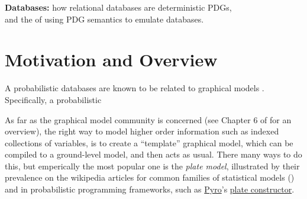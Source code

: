 \documentclass{article}
\theoremstyle{definition}
\theoremstyle{remark}
\begin{document}
\begin{center}
  \textbf{ \Large Databases:} how relational databases are deterministic PDGs,\\
  and the of using PDG semantics to emulate databases.
\end{center}

\section{Motivation and Overview}

A probabilistic databases are known to be related to graphical models \cite[\S 1.2.7]{suciu2011probabilistic}. Specifically, a probabilistic 

As far as the graphical model community is concerned (see Chapter 6 of \cite{KF09} for an overview), the right way to model higher order information such as indexed collections of variables, is to create a ``template'' graphical model, which can be compiled to a ground-level model, and then acts as usual. There many ways to do this, but emperically the most popular one is the \emph{plate model}, illustrated by their prevalence on the wikipedia articles for common families of statistical models ()
and in probabilistic programming frameworks, such as \href{https://pyro.ai/}{Pyro}'s \href{http://docs.pyro.ai/en/0.3.0-release/primitives.html#pyro.plate}{plate constructor}.
\end{document}
